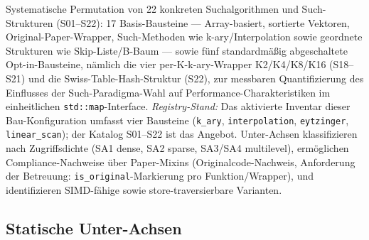 Systematische Permutation von 22 konkreten Suchalgorithmen und Such-Strukturen (S01--S22): 17 Basis-Bausteine --- Array-basiert, sortierte Vektoren, Original-Paper-Wrapper, Such-Methoden wie k-ary/\allowbreak{}Interpolation sowie geordnete Strukturen wie Skip-Liste/\allowbreak{}B-Baum --- sowie fünf standardmäßig abgeschaltete Opt-in-Bausteine, nämlich die vier per-K-k-ary-Wrapper K2/\allowbreak{}K4/\allowbreak{}K8/\allowbreak{}K16 (S18--S21) und die Swiss-Table-Hash-Struktur (S22), zur messbaren Quantifizierung des Einflusses der Such-Paradigma-Wahl auf Performance-Charakteristiken im einheitlichen \texttt{std::map}-Interface\@. \emph{Registry-Stand:} Das aktivierte Inventar dieser Bau-Konfiguration umfasst vier Bausteine (\texttt{k\_\allowbreak{}ary}, \texttt{interpolation}, \texttt{eytzinger}, \texttt{linear\_\allowbreak{}scan}); der Katalog S01--S22 ist das Angebot. Unter-Achsen klassifizieren nach Zugriffsdichte (SA1 dense, SA2 sparse, SA3/\allowbreak{}SA4 multilevel), ermöglichen Compliance-Nachweise über Paper-Mixins (Originalcode-Nachweis, Anforderung der Betreuung: \texttt{is\_\allowbreak{}original}-Markierung pro Funktion/\allowbreak{}Wrapper), und identifizieren SIMD-fähige sowie store-traversierbare Varianten.

\subsection*{Statische Unter-Achsen}

